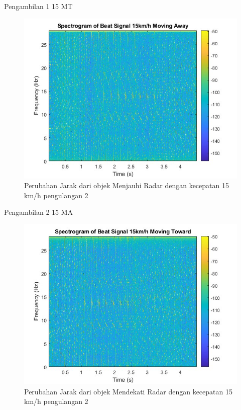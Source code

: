 Pengambilan 1 15 MT

\begin{figure}
	\centering
	\includegraphics[scale=0.6]{pics/bab5/Velocity/2_15MA.jpg}
	\caption{Perubahan Jarak dari objek Menjauhi Radar dengan kecepatan 15 km/h pengulangan 2}
	\label{fig:pengambilan2_15MA}
\end{figure}

Pengambilan 2 15 MA

\begin{figure}
	\centering
	\includegraphics[scale=0.6]{pics/bab5/Velocity/2_15MT.jpg}
	\caption{Perubahan Jarak dari objek Mendekati Radar dengan kecepatan 15 km/h pengulangan 2}
	\label{fig:pengambilan2_15MT}
\end{figure}

